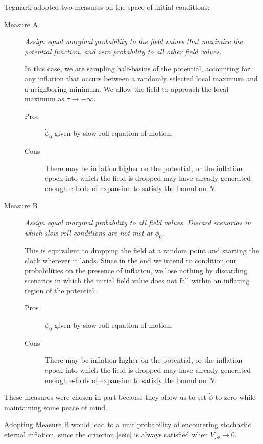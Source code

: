     Tegmark \cite{tegmark08} adopted two measures on the space of initial conditions:
    \begin{description}
    
        \item[Measure A] {\it Assign equal marginal probability to the field values that maximize the potential function, and zero probability to all other field values.} %
        
        In this case, we are sampling half-basins of the potential, accounting for any inflation that occurs between a randomly selected local maximum and a neighboring minimum.  We allow the field to approach the local maximum as $\tau \to -\infty$.
        
        \begin{description}
        \item[Pros] $\dot\phi_0$ given by slow roll equation of motion.
        \item[Cons] There may be inflation higher on the potential, or the inflation epoch into which the field is dropped may have already generated enough e-folds of expansion to satisfy the bound on $N$.
        \end{description}
        
        \item[Measure B] {\it Assign equal marginal probability to all field values.  Discard scenarios in which slow roll conditions are not met at $\phi_0$. %
        }
        
        This is equivalent to dropping the field at a random point and starting the clock wherever it lands.  Since in the end we intend to condition our probabilities on the presence of inflation, we lose nothing by discarding scenarios in which the initial field value does not fall within an inflating region of the potential.
        
        \begin{description}
        \item[Pros] $\dot\phi_0$ given by slow roll equation of motion.
        \item[Cons] There may be inflation higher on the potential, or the inflation epoch into which the field is dropped may have already generated enough e-folds of expansion to satisfy the bound on $N$.
        \end{description}
        
    \end{description}
    
    These measures were chosen in part because they allow us to set $\dot\phi$ to zero while maintaining some peace of mind.
    
    Adopting Measure B would lead to a unit probability of encourering stochastic eternal inflation, since the criterion \eqref{seic} is always satisfied when $V_{,\phi} \to 0$.

